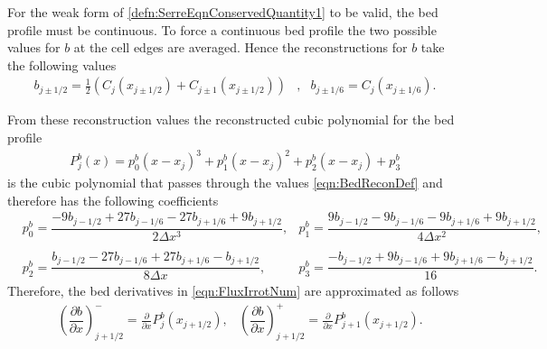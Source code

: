\documentclass[times]{elsarticle}
\begin{document}
For the weak form of \eqref{defn:SerreEqnConservedQuantity1} to be valid, the bed profile must be continuous. To force a continuous bed profile the two possible values for $b$ at the cell edges are averaged. Hence the reconstructions for $b$ take the following values
\begin{align}
\label{eqn:BedReconDef}
b_{j\pm1/2} =  \frac{1}{2}\left( C_j(x_{j\pm 1/2}) + C_{j\pm 1}(x_{j\pm 1/2})\right)&,& 	b_{j\pm 1/6} =  C_j(x_{j\pm 1/6}).
\end{align}

From these reconstruction values the reconstructed cubic polynomial for the bed profile
\begin{align*}
P^b_j(x) = p^b_0 (x - x_j)^3 + p^b_1(x-x_j)^2 + p^b_2(x- x_j) + p^b_3
\end{align*}
is the cubic polynomial that passes through the values \eqref{eqn:BedReconDef} and therefore has the following coefficients
\begin{align*}
&p^b_0 =  \dfrac{-9b_{j-1/2} + 27b_{j-1/6} - 27 b_{j+1/6} + 9b_{j+1/2}}{2 \Delta x^3}, 
&p^b_1 =  \dfrac{9b_{j-1/2} - 9b_{j-1/6} - 9b_{j+1/6} + 9b_{j+1/2}}{4 \Delta x^2},\\ \\ 
&p^b_2 =  \dfrac{b_{j-1/2} - 27b_{j-1/6} + 27 b_{j+1/6} - b_{j+1/2}}{8 \Delta x},
&p^b_3 =  \dfrac{-b_{j-1/2}  + 9b_{j-1/6} + 9 b_{j+1/6} - b_{j+1/2}}{16}.
\end{align*}
Therefore, the bed derivatives in \eqref{eqn:FluxIrrotNum} are approximated as follows
\begin{align}
\label{eqn:PolyDerivb}
&\left(\dfrac{\partial {b}}{\partial x} \right)^-_{j + 1/2} = \frac{\partial }{\partial x}P^b_j(x_{j+1/2}), 
&\left(\dfrac{\partial {b}}{\partial x} \right)^+_{j + 1/2} = \frac{\partial }{\partial x}P^b_{j+1}(x_{j+1/2}). 
\end{align}
\end{document}
